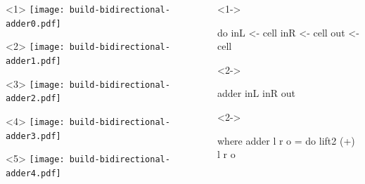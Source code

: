 \documentclass[UKenglish,usenames,dvipsnames,svgnames,table,aspectratio=169,mathserif]{beamer}
\newcommand{\nl}{\vspace{\baselineskip}}
\begin{document}
\begin{frame}[fragile]
\centering

\begin{columns}
\begin{column}{0.5\textwidth}
\nl
\begin{overlayarea}{0.5\textwidth}{0.4\textheight}
\begin{onlyenv}<1>
\texttt{[image: build-bidirectional-adder0.pdf]}
\end{onlyenv}
\begin{onlyenv}<2>
\texttt{[image: build-bidirectional-adder1.pdf]}
\end{onlyenv}
\begin{onlyenv}<3>
\texttt{[image: build-bidirectional-adder2.pdf]}
\end{onlyenv}
\begin{onlyenv}<4>
\texttt{[image: build-bidirectional-adder3.pdf]}
\end{onlyenv}
\begin{onlyenv}<5>
\texttt{[image: build-bidirectional-adder4.pdf]}
\end{onlyenv}
\end{overlayarea}
\end{column}

\begin{column}{0.5\textwidth}
\begin{overlayarea}{0.5\textwidth}{0.3\textheight}
\begin{onlyenv}<1->
\begin{haskellcode}
do
  inL  <- cell
  inR  <- cell
  out  <- cell
\end{haskellcode}
\end{onlyenv}
\nl
\begin{onlyenv}<2->
\begin{haskellcode}
  adder inL inR out
\end{haskellcode}
\end{onlyenv}
\end{overlayarea}

\begin{overlayarea}{0.5\textwidth}{0.3\textheight}
\begin{onlyenv}<2->
\begin{haskellcode}
    where
      adder l r o = do
        lift2 (+) l r o
\end{haskellcode}
\end{onlyenv}
\end{overlayarea}
\end{column}

\end{columns}
\end{frame}
\end{document}
